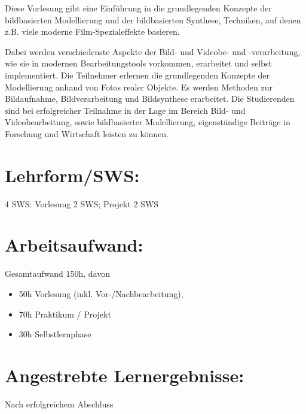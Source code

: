 Diese Vorlesung gibt eine Einführung in die grundlegenden Konzepte der
bildbasierten Modellierung und der bildbasierten Synthese, Techniken,
auf denen z.B. viele moderne Film-Spezialeffekte basieren.

Dabei werden verschiedenste Aspekte der Bild- und Videobe- und
-verarbeitung, wie sie in modernen Bearbeitungstools vorkommen,
erarbeitet und selbst implementiert. Die Teilnehmer erlernen die
grundlegenden Konzepte der Modellierung anhand von Fotos realer Objekte.
Es werden Methoden zur Bildaufnahme, Bildverarbeitung und Bildsynthese
erarbeitet. Die Studierenden sind bei erfolgreicher Teilnahme in der
Lage im Bereich Bild- und Videobearbeitung, sowie bildbasierter
Modellierung, eigenständige Beiträge in Forschung und Wirtschaft leisten
zu können.

\section*{Lehrform/SWS:}\label{lehrformsws-16}

4 SWS: Vorlesung 2 SWS; Projekt 2 SWS

\section*{Arbeitsaufwand:}\label{arbeitsaufwand-21}

Gesamtaufwand 150h, davon

\begin{itemize}
\tightlist
\item
  50h Vorlesung (inkl. Vor-/Nachbearbeitung),
\item
  70h Praktikum / Projekt
\item
  30h Selbstlernphase
\end{itemize}

\section*{Angestrebte
Lernergebnisse:}\label{angestrebte-lernergebnisse-15}

Nach erfolgreichem Abschluss

